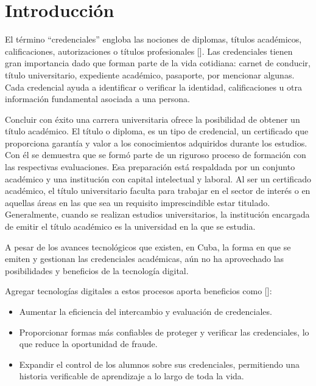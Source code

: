 \chapter*{Introducción}\label{chapter:introduction}

El t\'ermino “credenciales” engloba las nociones de diplomas, t\'itulos acad\'emicos, calificaciones, autorizaciones o t\'itulos profesionales [\cite{1}]. Las credenciales tienen gran importancia dado que forman parte de la vida cotidiana: carnet de conducir, t\'itulo universitario, expediente acad\'emico, pasaporte, por mencionar algunas. Cada credencial ayuda a identificar o verificar la identidad, calificaciones u otra informaci\'on fundamental asociada a una persona.\par

Concluir con \'exito una carrera universitaria ofrece la posibilidad de obtener un t\'itulo acad\'emico. El t\'itulo o diploma, es un tipo de credencial, un certificado que proporciona garant\'ia y valor a los conocimientos adquiridos durante los estudios. Con \'el se demuestra que se form\'o parte de un riguroso proceso de formaci\'on con las respectivas evaluaciones. Esa preparaci\'on est\'a respaldada por un conjunto acad\'emico y una instituci\'on con capital intelectual y laboral. Al ser un certificado acad\'emico, el t\'itulo universitario faculta para trabajar en el sector de inter\'es o en aquellas \'areas en las que sea un requisito imprescindible estar titulado. Generalmente, cuando se realizan estudios universitarios, la instituci\'on encargada de emitir el t\'itulo acad\'emico es la universidad en la que se estudia.\par

A pesar de los avances tecnol\'ogicos que existen, en Cuba, la forma en que se emiten y gestionan las credenciales acad\'emicas, a\'un no ha aprovechado las posibilidades y beneficios de la tecnolog\'ia digital. 

Agregar tecnolog\'ias digitales a estos procesos aporta beneficios como [\cite{3,4}]: 
\begin{itemize}
\item Aumentar la eficiencia del intercambio y evaluaci\'on de credenciales.
\item Proporcionar formas m\'as confiables de proteger y verificar las credenciales, lo que reduce la oportunidad de fraude.
\item Expandir el control de los alumnos sobre sus credenciales, permitiendo una historia verificable de aprendizaje a lo largo de toda la vida.
\end{itemize}

